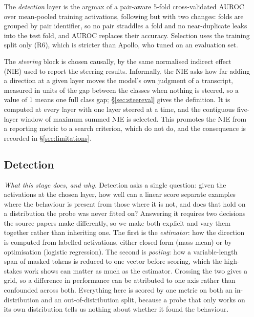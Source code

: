 \documentclass[conference]{IEEEtran}
\begin{document}
The \emph{detection} layer is the argmax of a pair-aware 5-fold cross-validated
AUROC over mean-pooled training activations, following \citet{mckenzie2025} but
with two changes: folds are grouped by pair identifier, so no pair straddles a
fold and no near-duplicate leaks into the test fold, and AUROC replaces their
accuracy. Selection uses the training split only (R6), which is stricter than
Apollo, who tuned on an evaluation set.

The \emph{steering} block is chosen causally, by the same normalised indirect effect
(NIE) used to report the steering results. Informally, the NIE asks how far adding a
direction at a given layer moves the model's own judgment of a transcript, measured in
units of the gap between the classes when nothing is steered, so a value of 1 means one
full class gap; §\ref{sec:steereval} gives the definition. It is computed at every
layer with one layer steered at a time, and the contiguous five-layer window of maximum
summed NIE is selected. This promotes the NIE from a reporting metric to a search
criterion, which \citeauthor{marks2024} do not do, and the consequence is
recorded in §\ref{sec:limitations}.

\subsection{Detection}
\label{sec:detection}

\emph{What this stage does, and why.} Detection asks a single question: given the
activations at the chosen layer, how well can a linear score separate examples
where the behaviour is present from those where it is not, and does that hold on
a distribution the probe was never fitted on? Answering it requires two decisions
the source papers make differently, so we make both explicit and vary them together
rather than inheriting one. The first is the \emph{estimator}: how the direction is
computed from labelled activations, either closed-form (mass-mean) or by optimisation
(logistic regression). The second is
\emph{pooling}: how a variable-length span of masked tokens is reduced to one
vector before scoring, which the high-stakes work shows can matter as much as the
estimator. Crossing the two gives a grid, so a difference in performance can be
attributed to one axis rather than confounded across both. Everything here is
scored by one metric on both an in-distribution and an out-of-distribution split,
because a probe that only works on its own distribution tells us nothing about
whether it found the behaviour.
\end{document}
